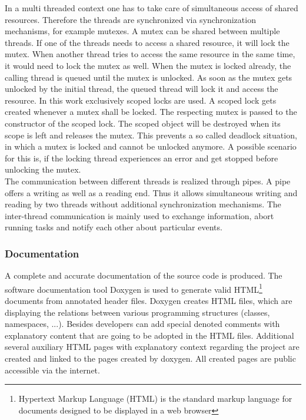 In a multi threaded context one has to take care of simultaneous access of shared resources. Therefore the threads are synchronized via synchronization mechanisms, for example mutexes. A mutex can be shared between multiple threads. If one of the threads needs to access a shared resource, it will lock the mutex. When another thread tries to access the same resource in the same time, it would need to lock the mutex as well. When the mutex is locked already, the calling thread is queued until the mutex is unlocked. As soon as the mutex gets unlocked by the initial thread, the queued thread will lock it and access the resource. In this work exclusively scoped locks are used. A scoped lock gets created whenever a mutex shall be locked. The respecting mutex is passed to the constructor of the scoped lock. The scoped object will be destroyed when its scope is left and releases the mutex. This prevents a so called deadlock situation, in which a mutex is locked and cannot be unlocked anymore. A possible scenario for this is, if the locking thread experiences an error and get stopped before unlocking the mutex.\\

The communication between different threads is realized through pipes. A pipe offers a writing as well as a reading end. Thus it allows simultaneous writing and reading by two threads without additional synchronization mechanisms. The inter-thread communication is mainly used to exchange information, abort running tasks and notify each other about particular events.

\subsubsection{Documentation}

A complete and accurate documentation of the source code is produced. The software documentation tool Doxygen \cite{doxygen} is used to generate valid HTML\footnote{Hypertext Markup Language (HTML) is the standard markup language for documents designed to be displayed in a web browser} documents from annotated header files. Doxygen creates HTML files, which are displaying the relations between various programming structures (classes, namespaces, ...). Besides developers can add special denoted comments with explanatory content that are going to be adopted in the HTML files. Additional several auxiliary HTML pages with explanatory context regarding the project are created and linked to the pages created by doxygen. All created pages \cite{docu} are public accessible via the internet.\\

